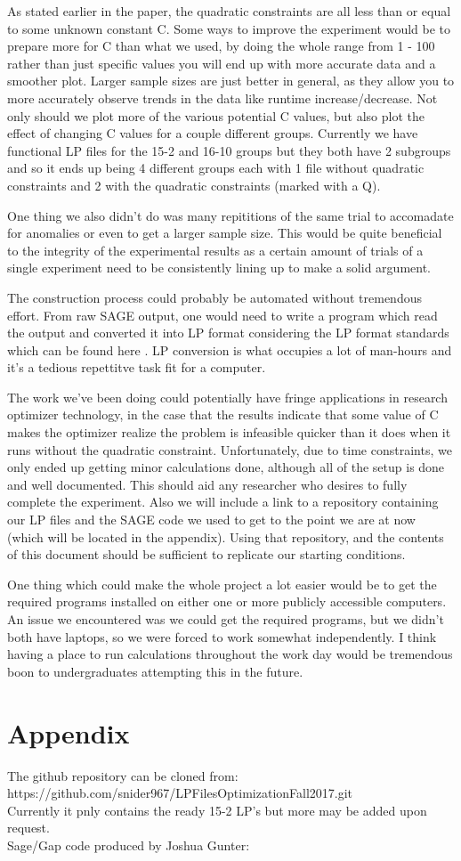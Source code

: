 \documentclass[11pt]{article} %
\theoremstyle{definition}
\theoremstyle{remark}
\begin{document}
As stated earlier in the paper, the quadratic constraints are all less than or equal to some unknown constant C. Some ways to improve the experiment would be to prepare more for C than what we used, by doing the whole range from 1 - 100 rather than just specific values you will end up with more accurate data and a smoother plot. Larger sample sizes are just better in general, as they allow you to more accurately observe trends in the data like runtime increase/decrease. Not only should we plot more of the various potential C values, but also plot the effect of changing C values for a couple different groups. Currently we have functional LP files for the 15-2 and 16-10 groups but they both have 2 subgroups and so it ends up being 4 different groups each with 1 file without quadratic constraints and 2 with the quadratic constraints (marked with a Q).

One thing we also didn't do was many repititions of the same trial to accomadate for anomalies or even to get a larger sample size. This would be quite beneficial to the integrity of the experimental results as a certain amount of trials of a single experiment need to be consistently lining up to make a solid argument.   

The construction process could probably be automated without tremendous effort. From raw SAGE output, one would need to write a program which read the output and converted it into LP format considering the LP format standards which can be found here \cite{some}. LP conversion is what occupies a lot of man-hours and it's a tedious repettitve task fit for a computer.

The work we've been doing could potentially have fringe applications in research optimizer technology, in the case that the results indicate that some value of C makes the optimizer realize the problem is infeasible quicker than it does when it runs without the quadratic constraint. Unfortunately, due to time constraints, we only ended up getting minor calculations done, although all of the setup is done and well documented. This should aid any researcher who desires to fully complete the experiment. Also we will include a link to a repository containing our LP files and the SAGE code we used to get to the point we are at now (which will be located in the appendix). Using that repository, and the contents of this document should be sufficient to replicate our starting conditions. 

One thing which could make the whole project a lot easier would be to get the required programs installed on either one or more publicly accessible computers. An issue we encountered was we could get the required programs, but we didn't both have laptops, so we were forced to work somewhat independently. I think having a place to run calculations throughout the work day would be tremendous boon to undergraduates attempting this in the future.

\section{Appendix}

The github repository can be cloned from:\\
https://github.com/snider967/LPFilesOptimizationFall2017.git\\
Currently it pnly contains the ready 15-2 LP's but more may be added upon request.\\
Sage/Gap code produced by Joshua Gunter:
\end{document}
